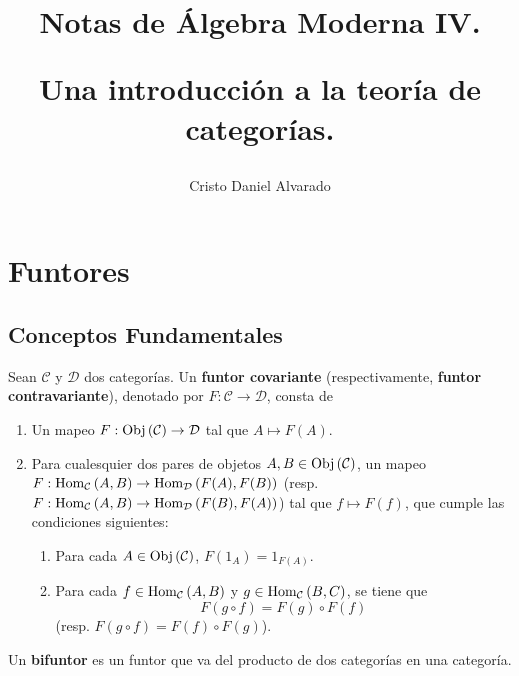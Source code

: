 \documentclass[12pt]{report}
\theoremstyle{largebreak}
\newcommand\cf[3]{\ensuremath{#1:#2\rightarrow#3}}
\newcommand{\Obj}[1]{\ensuremath{\textup{Obj}\left(#1\right)}}
\newcommand{\Hom}[3]{\ensuremath{\textup{Hom}_{#1}\left(#2,#3\right)}}
\begin{document}
    \setlength{\parskip}{5pt} %
    \setlength{\parindent}{12pt} %
    \title{Notas de Álgebra Moderna IV.
    
    Una introducción a la teoría de categorías.}
    \author{Cristo Daniel Alvarado}
    \maketitle

    \tableofcontents %

    \setcounter{chapter}{2} %
    
    \chapter{Funtores}

    \section{Conceptos Fundamentales}
    
    \begin{mydef}
        Sean $\mathcal{C}$ y $\mathcal{D}$ dos categorías. Un \textbf{funtor covariante} (respectivamente, \textbf{funtor contravariante}), denotado por $\cf{F}{\mathcal{C}}{\mathcal{D}}$, consta de
        \begin{enumerate}
            \item Un mapeo $\cf{F}{\Obj{\mathcal{C}}}{\mathcal{D}}$ tal que $A\mapsto F(A)$.
            \item Para cualesquier dos pares de objetos $A,B\in\Obj{\mathcal{C}}$, un mapeo $\cf{F}{\Hom{\mathcal{C}}{A}{B}}{\Hom{\mathcal{D}}{F(A)}{F(B)}}$ (resp. $\cf{F}{\Hom{\mathcal{C}}{A}{B}}{\Hom{\mathcal{D}}{F(B)}{F(A)}}$) tal que $f\mapsto F(f)$, que cumple las condiciones siguientes:
            \begin{enumerate}
                \item Para cada $A\in\Obj{\mathcal{C}}$, $F(1_A)=1_{F(A)}$.
                \item Para cada $f\in\Hom{\mathcal{C}}{A}{B}$ y $g\in\Hom{\mathcal{C}}{B}{C}$, se tiene que
                \begin{equation*}
                    F(g\circ f)=F(g)\circ F(f)
                \end{equation*}
                (resp. $F(g\circ f)=F(f)\circ F(g)$).
            \end{enumerate}
        \end{enumerate}
        Un \textbf{bifuntor} es un funtor que va del producto de dos categorías en una categoría.
    \end{mydef}
\end{document}

